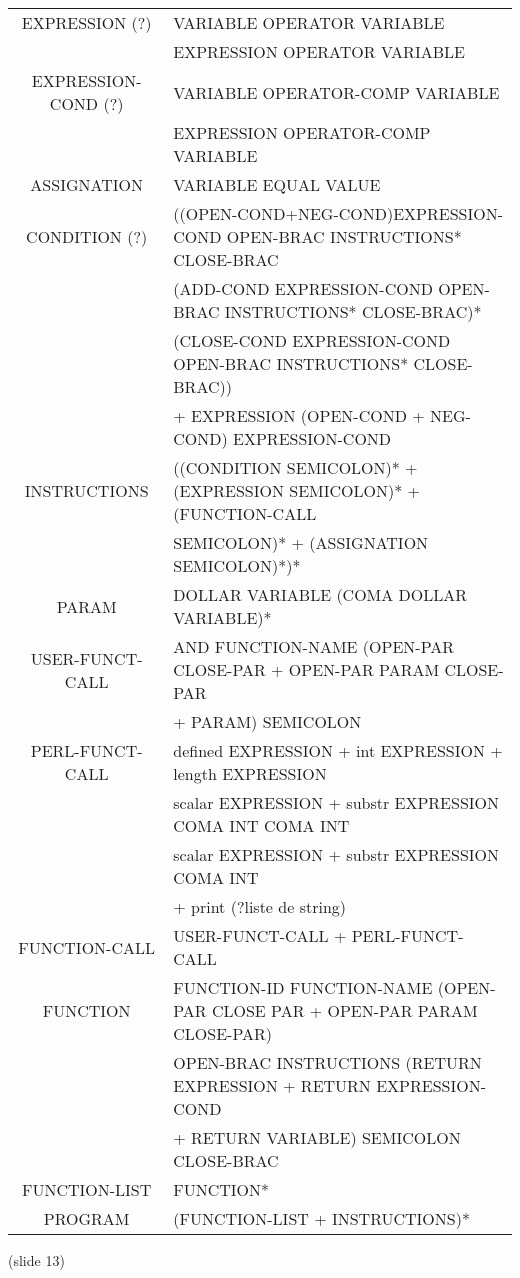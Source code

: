\documentclass[a4paper,10pt]{article}
\begin{document}
\hspace{-4.5cm}\begin{tabular}{|c|l|}
\hline
EXPRESSION (?)		& VARIABLE OPERATOR VARIABLE   \\
					& EXPRESSION OPERATOR VARIABLE \\ \hline
EXPRESSION-COND (?)	& VARIABLE OPERATOR-COMP VARIABLE   \\
					& EXPRESSION OPERATOR-COMP VARIABLE \\ \hline
ASSIGNATION			& VARIABLE EQUAL VALUE \\ \hline
CONDITION (?)		& ((OPEN-COND+NEG-COND)EXPRESSION-COND OPEN-BRAC INSTRUCTIONS* CLOSE-BRAC\\
					& (ADD-COND EXPRESSION-COND OPEN-BRAC INSTRUCTIONS* CLOSE-BRAC)* \\
					& (CLOSE-COND EXPRESSION-COND OPEN-BRAC INSTRUCTIONS* CLOSE-BRAC))\\
					& + EXPRESSION (OPEN-COND + NEG-COND) EXPRESSION-COND \\ \hline
INSTRUCTIONS		& ((CONDITION SEMICOLON)* + (EXPRESSION SEMICOLON)* + (FUNCTION-CALL \\ 
					& SEMICOLON)* + (ASSIGNATION SEMICOLON)*)* \\ \hline
PARAM				& DOLLAR VARIABLE (COMA DOLLAR VARIABLE)* \\ \hline
USER-FUNCT-CALL		& AND FUNCTION-NAME (OPEN-PAR CLOSE-PAR + OPEN-PAR PARAM CLOSE-PAR  \\
					& + PARAM) SEMICOLON \\ \hline
PERL-FUNCT-CALL		& defined EXPRESSION + int EXPRESSION + length EXPRESSION \\ 
					& scalar EXPRESSION + substr EXPRESSION COMA INT COMA INT \\
					& scalar EXPRESSION + substr EXPRESSION COMA INT  \\
					& + print (?liste de string) \\ \hline
FUNCTION-CALL		& USER-FUNCT-CALL + PERL-FUNCT-CALL \\ \hline
FUNCTION			& FUNCTION-ID FUNCTION-NAME (OPEN-PAR CLOSE PAR + OPEN-PAR PARAM CLOSE-PAR) \\
					& OPEN-BRAC INSTRUCTIONS (RETURN EXPRESSION + RETURN EXPRESSION-COND \\
					& + RETURN VARIABLE) SEMICOLON CLOSE-BRAC \\ \hline
FUNCTION-LIST		& FUNCTION* \\ \hline
PROGRAM				& (FUNCTION-LIST + INSTRUCTIONS)*\\ \hline

					
					
\end{tabular}




(slide 13)
\end{document}
